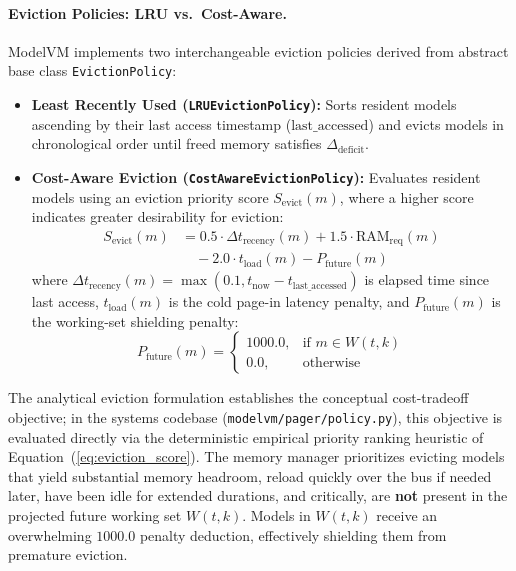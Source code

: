 \paragraph{Eviction Policies: LRU vs.\ Cost-Aware.}
ModelVM implements two interchangeable eviction policies derived from abstract base class \texttt{EvictionPolicy}:
\begin{itemize}
    \item \textbf{Least Recently Used (\texttt{LRUEvictionPolicy}):} Sorts resident models ascending by their last access timestamp ($\text{last\_accessed}$) and evicts models in chronological order until freed memory satisfies $\Delta_{\text{deficit}}$.
    \item \textbf{Cost-Aware Eviction (\texttt{CostAwareEvictionPolicy}):} Evaluates resident models using an eviction priority score $S_{\text{evict}}(m)$, where a higher score indicates greater desirability for eviction:
    \begin{equation}
    \begin{aligned}
    S_{\text{evict}}(m) &= 0.5 \cdot \Delta t_{\text{recency}}(m) + 1.5 \cdot \text{RAM}_{\text{req}}(m) \\
    &\quad - 2.0 \cdot t_{\text{load}}(m) - P_{\text{future}}(m)
    \end{aligned}
    \label{eq:eviction_score}
    \end{equation}
    where $\Delta t_{\text{recency}}(m) = \max(0.1, t_{\text{now}} - t_{\text{last\_accessed}})$ is elapsed time since last access, $t_{\text{load}}(m)$ is the cold page-in latency penalty, and $P_{\text{future}}(m)$ is the working-set shielding penalty:
    \begin{equation}
    P_{\text{future}}(m) = \begin{cases} 1000.0, & \text{if } m \in W(t, k) \\ 0.0, & \text{otherwise} \end{cases}
    \end{equation}
\end{itemize}
The analytical eviction formulation establishes the conceptual cost-tradeoff objective; in the systems codebase (\texttt{modelvm/pager/policy.py}), this objective is evaluated directly via the deterministic empirical priority ranking heuristic of Equation~(\ref{eq:eviction_score}). The memory manager prioritizes evicting models that yield substantial memory headroom, reload quickly over the bus if needed later, have been idle for extended durations, and critically, are \textbf{not} present in the projected future working set $W(t, k)$. Models in $W(t, k)$ receive an overwhelming $1000.0$ penalty deduction, effectively shielding them from premature eviction.

